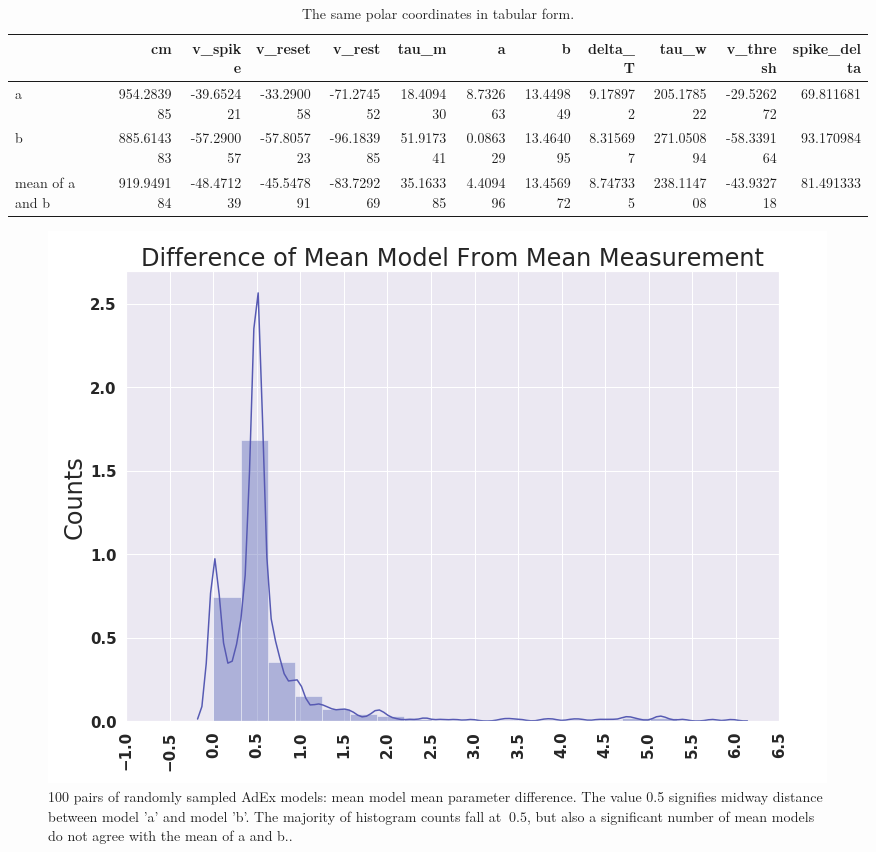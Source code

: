 \begin{table}


\begin{adjustbox}{width=\columnwidth,center}

\begin{tabular}{lrrrrrrrrrrr}
\toprule {} &          cm &    v\_spike &    v\_reset &     v\_rest &      tau\_m &         a &          b &   delta\_T &       tau\_w &   v\_thresh &  spike\_delta \\
\midrule
a           &  954.283985 & -39.652421 & -33.290058 & -71.274552 &  18.409430 &  8.732663 &  13.449849 &  9.178972 &  205.178522 & -29.526272 &    69.811681 \\
b           &  885.614383 & -57.290057 & -57.805723 & -96.183985 &  51.917341 &  0.086329 &  13.464095 &  8.315697 &  271.050894 & -58.339164 &    93.170984 \\
mean of a and b &  919.949184 & -48.471239 & -45.547891 & -83.729269 &  35.163385 &  4.409496 &  13.456972 &  8.747335 &  238.114708 & -43.932718 &    81.491333 \\
\bottomrule
\end{tabular}
\end{adjustbox}
\caption[coordinate information in tabular form]{The same polar coordinates in tabular form.}
\end{table}



\begin{figure}
    \centering
    \includegraphics{figures/mean_model_vs_mean_measurement.png}
    \caption[100 pairs of randomly sampled AdEx models: mean model mean parameter difference]{100 pairs of randomly sampled AdEx models: mean model mean parameter difference. The value 0.5 signifies midway distance between model 'a' and model 'b'. The majority of histogram counts fall at $~0.5$, but also a significant number of mean models do not agree with the mean of a and b..}
    \label{fig:mean-model-1}
\end{figure}


